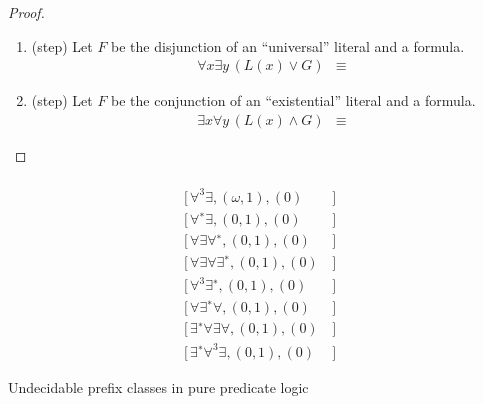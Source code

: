 \begin{proof}
\begin{enumerate}
		\item (step)
		Let \( F \) be the disjunction of an “universal” literal and a formula.
		\begin{align*}
		\forall x \exists y\,(L(x)\lor G)
		&\equiv
		\end{align*}

		\item (step)
		Let \( F \) be the conjunction of an “existential” literal and a formula.
		\begin{align*}
		\exists x \forall y\,(L(x)\land G)
		&\equiv
		\end{align*}


	\end{enumerate}
\end{proof}



%
%



\begin{table}[hbt]
	\begin{align*}
	[\,\forall\exists\forall, (\omega, 1), (0)&\,] \tag{Kahr 1962}
	\\
	[\,\forall^3 \exists, (\omega, 1), (0)&\,] \tag{Surányi 1959}
	\\
	[\,\forall^{∗} \exists, (0, 1), (0)&\,] \tag{Kalmár-Surányi 1950}
	\\
	[\,\forall\exists\forall^{∗} , (0, 1), (0)&\,]  \tag{Denton 1960}
	\\
	[\,\forall\exists\forall\exists^{∗}, (0, 1), (0)&\,] \tag{Gurevich 1966}
	\\
	[\,\forall^3 \exists^{∗} , (0, 1), (0)&\,] \tag{Kalmár-Surányi 1947}
	\\
	[\,\forall\exists^{∗} \forall, (0, 1), (0)&\,] \tag{Kostyrko-Genenz 1964}
	\\
	[\,\exists^{∗} \forall\exists\forall, (0, 1), (0)&\,] \tag{Surányi 1959}
	\\
	[\,\exists^{∗} \forall^3 \exists, (0, 1), (0)&\,] \tag{Surányi 1959}
	\end{align*}
	\caption{Undecidable prefix classes in pure predicate logic}
	\label{tab:undecidable:PurePredicateLogic}
\end{table}

